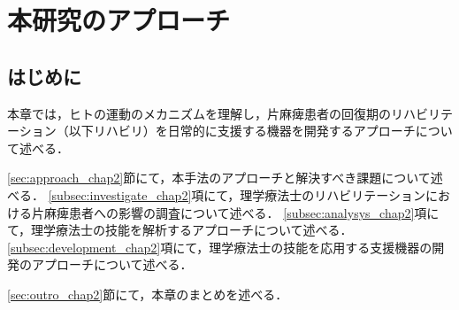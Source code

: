 \chapter{本研究のアプローチ}
\label{chap:approach}
\minitoc

\thispagestyle{empty}

\newpage
\section{はじめに}
\label{sec:intro_chap2}

本章では，ヒトの運動のメカニズムを理解し，片麻痺患者の回復期のリハビリテーション（以下リハビリ）を日常的に支援する機器を開発するアプローチについて述べる．


\ref{sec:approach_chap2}節にて，本手法のアプローチと解決すべき課題について述べる．
\ref{subsec:investigate_chap2}項にて，理学療法士のリハビリテーションにおける片麻痺患者への影響の調査について述べる．
\ref{subsec:analysys_chap2}項にて，理学療法士の技能を解析するアプローチについて述べる．
\ref{subsec:development_chap2}項にて，理学療法士の技能を応用する支援機器の開発のアプローチについて述べる．

\ref{sec:outro_chap2}節にて，本章のまとめを述べる．

\clearpage


%
%
%
%
%
%


